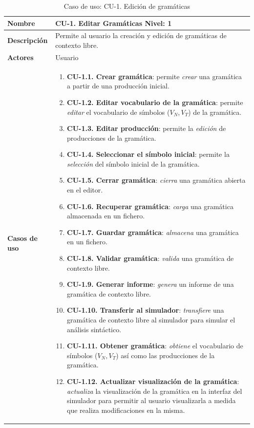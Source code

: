  \begin{longtable}[H]{|>{\columncolor[rgb]{0.63,0.79,0.95}}p{6cm} | p{8.5cm} |}
    \caption{Caso de uso: CU-1. Edición de gramáticas}
    \label{tablaCU1} \\
    \hline
    \textbf{Nombre} & \textbf{CU-1. Editar Gramáticas} \newline \textbf{Nivel}: 1 \\
    \hline
    \textbf{Descripción} & Permite al usuario la creación y edición de gramáticas de contexto libre. \\
    \hline
    \textbf{Actores} & Usuario \\
    \hline
    \textbf{Casos de uso} & 
    \begin{enumerate}
        \item \textbf{CU-1.1. Crear gramática}: permite \textit{crear} una gramática a partir de una producción inicial.
        \item \textbf{CU-1.2. Editar vocabulario de la gramática}: permite \textit{editar} el vocabulario de símbolos ($V_{N}, V_{T}$) de la gramática.
        \item \textbf{CU-1.3. Editar producción}: permite la \textit{edición} de producciones de la gramática.
        \item \textbf{CU-1.4. Seleccionar el símbolo inicial}: permite la \textit{selección} del símbolo inicial de la gramática.
        \item \textbf{CU-1.5. Cerrar gramática}: \textit{cierra} una gramática abierta en el editor.
        \item \textbf{CU-1.6. Recuperar gramática}: \textit{carga} una gramática almacenada en un fichero.
        \item \textbf{CU-1.7. Guardar gramática}: \textit{almacena} una gramática en un fichero.
        \item \textbf{CU-1.8. Validar gramática}: \textit{valida} una gramática de contexto libre.
        \item \textbf{CU-1.9. Generar informe}: \textit{genera} un informe de una gramática de contexto libre.
        \item \textbf{CU-1.10. Transferir al simulador}: \textit{transfiere} una gramática de contexto libre al simulador para simular el análisis sintáctico.
        \item \textbf{CU-1.11. Obtener gramática}: \textit{obtiene} el vocabulario de símbolos ($V_{N}, V_{T}$) así como las producciones de la gramática.
        \item \textbf{CU-1.12. Actualizar visualización de la gramática}: \textit{actualiza} la visualización de la gramática en la interfaz del simulador para permitir al usuario visualizarla a medida que realiza modificaciones en la misma.

\end{enumerate}
\end{longtable}
